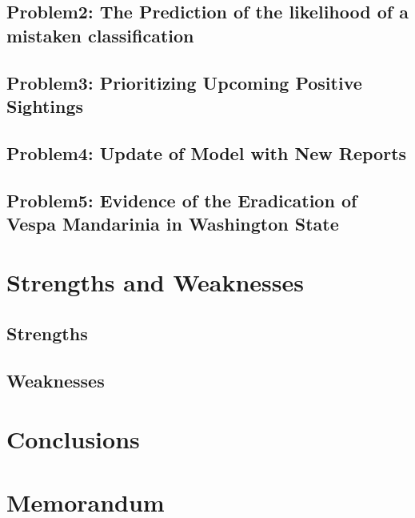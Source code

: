 \documentclass{mcmthesis}
\begin{document}
\subsection{Problem2: The Prediction of the likelihood of a mistaken classification}



\subsection{Problem3: Prioritizing Upcoming Positive Sightings}

\subsection{Problem4: Update of Model with New Reports}

\subsection{Problem5: Evidence of the Eradication of Vespa Mandarinia in Washington State}

\section{Strengths and Weaknesses}
\subsection{Strengths}
\subsection{Weaknesses}

\section{Conclusions}

\section{Memorandum}




\newpage
\end{document}
